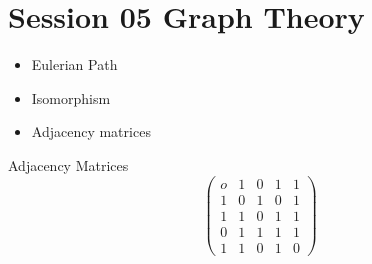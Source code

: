 
\section*{Session 05 Graph Theory}
\begin{itemize}
\item Eulerian Path
\item Isomorphism
\item Adjacency matrices
\end{itemize}
Adjacency Matrices
\[ \left( \begin{matrix}
o & 1 & 0 & 1 & 1 \\ 
1 & 0 & 1 & 0 & 1 \\ 
1 & 1 & 0 & 1 & 1 \\ 
0 & 1 & 1 & 1 & 1 \\ 
1 & 1 & 0 & 1 & 0
\end{matrix} \right) \]





